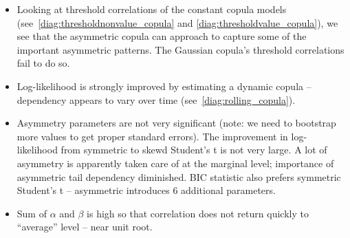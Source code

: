 \begin{itemize}
  \item Looking at threshold correlations of the constant copula models (see~\autoref{diag:thresholdnonvalue_copula} and \autoref{diag:thresholdvalue_copula}), we see that the asymmetric copula can approach to capture some of the important asymmetric patterns. The Gaussian copula's threshold correlations fail to do so.
  \item Log-likelihood is strongly improved by estimating a dynamic copula -- dependency appears to vary over time (see~\autoref{diag:rolling_copula}). 
  \item Asymmetry parameters are not very significant (note: we need to bootstrap more values to get proper standard errors). The improvement in log-likelihood from symmetric to skewd Student's t is not very large. A lot of asymmetry is apparently taken care of at the marginal level; importance of asymmetric tail dependency diminished. BIC statistic also prefers symmetric Student's t -- asymmetric introduces 6 additional parameters.
  \item Sum of $\alpha$ and $\beta$ is high so that correlation does not return quickly to ``average'' level -- near unit root.
\end{itemize}

